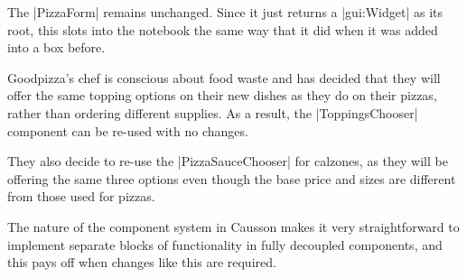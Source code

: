 \documentclass[11pt]{report}
\begin{document}
The |PizzaForm| remains unchanged. Since it just returns a |gui:Widget| as its root, this slots into the notebook the same way that it did when it was added into a box before.

Goodpizza's chef is conscious about food waste and has decided that they will offer the same topping options on their new dishes as they do on their pizzas, rather than ordering different supplies. As a result, the |ToppingsChooser| component can be re-used with no changes.

They also decide to re-use the |PizzaSauceChooser| for calzones, as they will be offering the same three options even though the base price and sizes are different from those used for pizzas.

The nature of the component system in Causson makes it very straightforward to implement separate blocks of functionality in fully decoupled components, and this pays off when changes like this are required.

\vspace{1mm}
\end{document}
